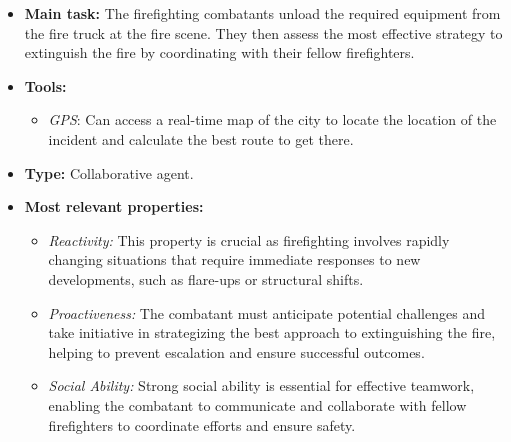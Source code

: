 \begin{itemize}
    \item \textbf{Main task:} The firefighting combatants unload the required equipment from the fire truck at the fire scene. They then assess the most effective strategy to extinguish the fire by coordinating with their fellow firefighters.
    \item \textbf{Tools:}
    \begin{itemize}
        \item \textit{GPS}: Can access a real-time map of the city to locate the location of the incident and calculate the best route to get there.
    \end{itemize}
    \item \textbf{Type:} Collaborative agent.
    \item \textbf{Most relevant properties:}
    \begin{itemize}
        \item \textit{Reactivity:} This property is crucial as firefighting involves rapidly changing situations that require immediate responses to new developments, such as flare-ups or structural shifts.
        \item \textit{Proactiveness:} The combatant must anticipate potential challenges and take initiative in strategizing the best approach to extinguishing the fire, helping to prevent escalation and ensure successful outcomes.
        \item \textit{Social Ability:} Strong social ability is essential for effective teamwork, enabling the combatant to communicate and collaborate with fellow firefighters to coordinate efforts and ensure safety.
    \end{itemize}
\end{itemize}
